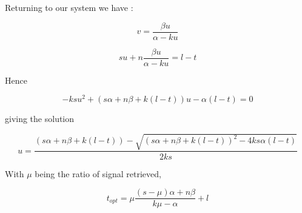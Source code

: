 \documentclass[a4paper]{article}
\begin{document}
Returning to our system we have :

\begin{equation}
    v = \frac{\beta u}{\alpha-ku}
\end{equation}

\begin{equation}
    s u + n \frac{\beta u}{\alpha-ku}  = l-t
\end{equation}

Hence

\begin{equation}
    -ksu^2+(s\alpha+n\beta+k(l-t))u-\alpha(l-t) = 0
\end{equation}

giving the solution

\begin{equation}
    u = \frac{(s\alpha+n\beta+k(l-t))-\sqrt{(s\alpha+n\beta+k(l-t))^2-4ks\alpha(l-t)}}{2ks}
\end{equation}

With $\mu$ being the ratio of signal retrieved, 

\begin{equation}
    t_{opt} = \mu\frac{(s-\mu)\alpha + n\beta}{k\mu-\alpha}+l
\end{equation}




\end{document}
